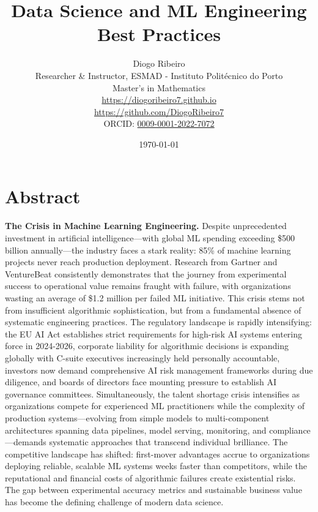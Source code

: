 \documentclass[11pt]{book}
\title{Data Science and ML Engineering Best Practices}
\author{Diogo Ribeiro\\Researcher \& Instructor, ESMAD - Instituto Politécnico do Porto\\Master's in Mathematics\\\href{https://diogoribeiro7.github.io}{https://diogoribeiro7.github.io}\\\href{https://github.com/DiogoRibeiro7}{https://github.com/DiogoRibeiro7}\\ORCID: \href{https://orcid.org/0009-0001-2022-7072}{0009-0001-2022-7072}}
\date{\today}
\begin{document}
\frontmatter
\maketitle

\chapter*{Abstract}

\noindent
\textbf{The Crisis in Machine Learning Engineering.} Despite unprecedented investment in artificial intelligence—with global ML spending exceeding \$500 billion annually—the industry faces a stark reality: 85\% of machine learning projects never reach production deployment. Research from Gartner and VentureBeat consistently demonstrates that the journey from experimental success to operational value remains fraught with failure, with organizations wasting an average of \$1.2 million per failed ML initiative. This crisis stems not from insufficient algorithmic sophistication, but from a fundamental absence of systematic engineering practices. The regulatory landscape is rapidly intensifying: the EU AI Act establishes strict requirements for high-risk AI systems entering force in 2024-2026, corporate liability for algorithmic decisions is expanding globally with C-suite executives increasingly held personally accountable, investors now demand comprehensive AI risk management frameworks during due diligence, and boards of directors face mounting pressure to establish AI governance committees. Simultaneously, the talent shortage crisis intensifies as organizations compete for experienced ML practitioners while the complexity of production systems—evolving from simple models to multi-component architectures spanning data pipelines, model serving, monitoring, and compliance—demands systematic approaches that transcend individual brilliance. The competitive landscape has shifted: first-mover advantages accrue to organizations deploying reliable, scalable ML systems weeks faster than competitors, while the reputational and financial costs of algorithmic failures create existential risks. The gap between experimental accuracy metrics and sustainable business value has become the defining challenge of modern data science.
\end{document}
